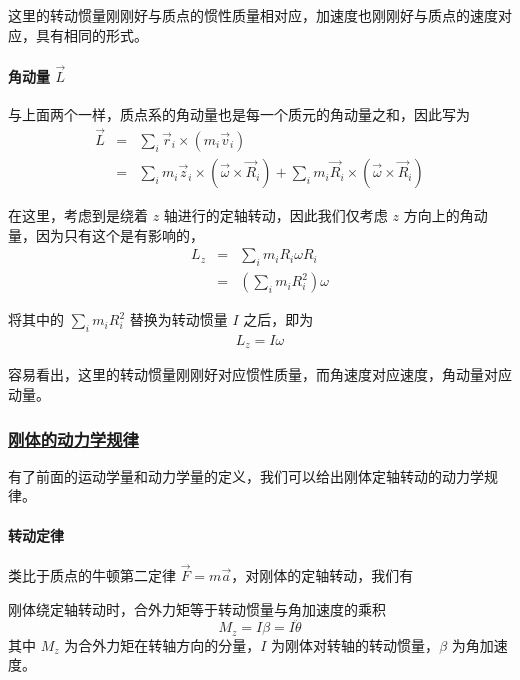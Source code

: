 这里的转动惯量刚刚好与质点的惯性质量相对应，加速度也刚刚好与质点的速度对应，具有相同的形式。

\paragraph*{角动量 $\vec{L}$} 与上面两个一样，质点系的角动量也是每一个质元的角动量之和，因此写为
\begin{eqnarray*}
    \vec{L} &=& \sum_i \vec{r}_i \times \left(m_i\vec{v}_i\right) \\
    &=& \sum_i m_i \vec{z}_i \times (\vec{\omega} \times \vec{R}_i) + \sum_i m_i \vec{R}_i \times (\vec{\omega} \times \vec{R}_i)
\end{eqnarray*}

在这里，考虑到是绕着 $z$ 轴进行的定轴转动，因此我们仅考虑 $z$ 方向上的角动量，因为只有这个是有影响的，
\begin{eqnarray*}
    L_z &=& \sum_i m_i R_i \omega R_i \\
    &=& \left(\sum_i m_i R_i^2\right) \omega 
\end{eqnarray*}

将其中的 $\displaystyle \sum_i m_i R_i^2$ 替换为转动惯量 $I$ 之后，即为
\begin{eqnarray*}
    L_z = I\omega
\end{eqnarray*}

容易看出，这里的转动惯量刚刚好对应惯性质量，而角速度对应速度，角动量对应动量。


\subsubsection{\protect\hyperlink{:}{刚体的动力学规律}}

有了前面的运动学量和动力学量的定义，我们可以给出刚体定轴转动的动力学规律。

\paragraph*{转动定律} 类比于质点的牛顿第二定律 $\vec{F} = m\vec{a}$，对刚体的定轴转动，我们有

\begin{theorem}[转动定律]
    刚体绕定轴转动时，合外力矩等于转动惯量与角加速度的乘积
    \begin{equation}
        M_z = I\beta = I\ddot{\theta}
    \end{equation}
    其中 $M_z$ 为合外力矩在转轴方向的分量，$I$ 为刚体对转轴的转动惯量，$\beta$ 为角加速度。
\end{theorem}

